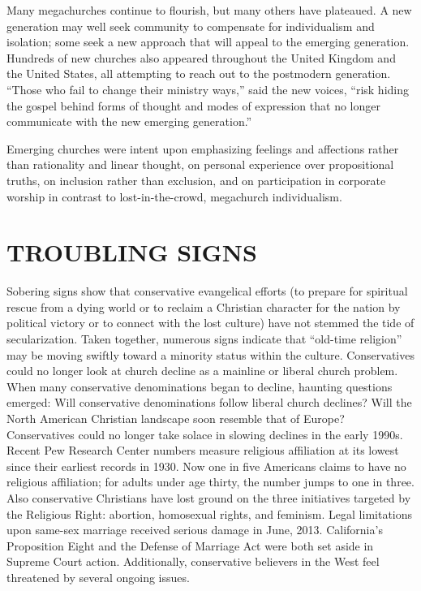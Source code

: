 Many megachurches continue to flourish, but many others have plateaued. A new generation may well
seek community to compensate for individualism and isolation; some seek a new approach that will
appeal to the emerging generation. Hundreds of new churches also appeared throughout the United
Kingdom and the United States, all attempting to reach out to the postmodern generation. “Those who
fail to change their ministry ways,” said the new voices, “risk hiding the gospel behind forms of
thought and modes of expression that no longer communicate with the new emerging generation.”

Emerging churches were intent upon emphasizing feelings and affections rather than rationality and
linear thought, on personal experience over propositional truths, on inclusion rather than
exclusion, and on participation in corporate worship in contrast to lost-in-the-crowd, megachurch
individualism.

\section{TROUBLING SIGNS}

Sobering signs show that conservative evangelical efforts (to prepare for spiritual rescue from a
dying world or to reclaim a Christian character for the nation by political victory or to connect
with the lost culture) have not stemmed the tide of secularization. Taken together, numerous signs
indicate that “old-time religion” may be moving swiftly toward a minority status within the culture.
Conservatives could no longer look at church decline as a mainline or liberal church problem. When
many conservative denominations began to decline, haunting questions emerged: Will conservative
denominations follow liberal church declines? Will the North American Christian landscape soon
resemble that of Europe? Conservatives could no longer take solace in slowing declines in the early
1990s. Recent Pew Research Center numbers measure religious affiliation at its lowest since their
earliest records in 1930. Now one in five Americans claims to have no religious affiliation; for
adults under age thirty, the number jumps to one in three. Also conservative Christians have lost
ground on the three initiatives targeted by the Religious Right: abortion, homosexual rights, and
feminism. Legal limitations upon same-sex marriage received serious damage in June, 2013.
California’s Proposition Eight and the Defense of Marriage Act were both set aside in Supreme Court
action. Additionally, conservative believers in the West feel threatened by several ongoing issues.

